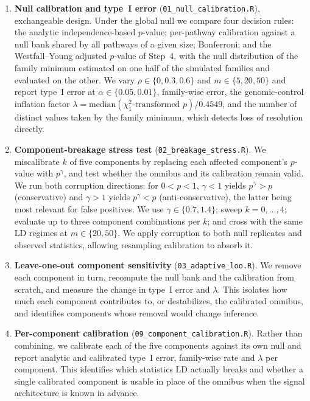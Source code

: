 \begin{enumerate}
\item \textbf{Null calibration and type~I error} (\texttt{01\_null\_calibration.R}), exchangeable design. Under the global null we compare four decision rules: the analytic independence-based $p$-value; per-pathway calibration against a null bank shared by all pathways of a given size; Bonferroni; and the Westfall--Young adjusted $p$-value of Step~4, with the null distribution of the family minimum estimated on one half of the simulated families and evaluated on the other. We vary $\rho\in\{0,0.3,0.6\}$ and $m\in\{5,20,50\}$ and report type~I error at $\alpha\in\{0.05,0.01\}$, family-wise error, the genomic-control inflation factor $\lambda=\mathrm{median}(\chi^2_1\text{-transformed }p)/0.4549$, and the number of distinct values taken by the family minimum, which detects loss of resolution directly.

\item \textbf{Component-breakage stress test} (\texttt{02\_breakage\_stress.R}).
We miscalibrate $k$ of five components by replacing each affected component’s $p$-value with $p^{\gamma}$, and test whether the omnibus and its calibration remain valid. We run both corruption directions: for $0<p<1$, $\gamma<1$ yields $p^{\gamma}>p$ (conservative) and $\gamma>1$ yields $p^{\gamma}<p$ (anti-conservative), the latter being most relevant for false positives. We use $\gamma\in\{0.7,1.4\}$; sweep $k=0,\dots,4$; evaluate up to three component combinations per $k$; and cross with the same LD regimes at $m\in\{20,50\}$. We apply corruption to both null replicates and observed statistics, allowing resampling calibration to absorb it.

\item \textbf{Leave-one-out component sensitivity} (\texttt{03\_adaptive\_loo.R}).
We remove each component in turn, recompute the null bank and the calibration from scratch, and measure the change in type~I error and $\lambda$. This isolates how much each component contributes to, or destabilizes, the calibrated omnibus, and identifies components whose removal would change inference.

\item \textbf{Per-component calibration} (\texttt{09\_component\_calibration.R}).
Rather than combining, we calibrate each of the five components against its own null and report analytic and calibrated type~I error, family-wise rate and $\lambda$ per component. This identifies which statistics LD actually breaks and whether a single calibrated component is usable in place of the omnibus when the signal architecture is known in advance.


\end{enumerate}
